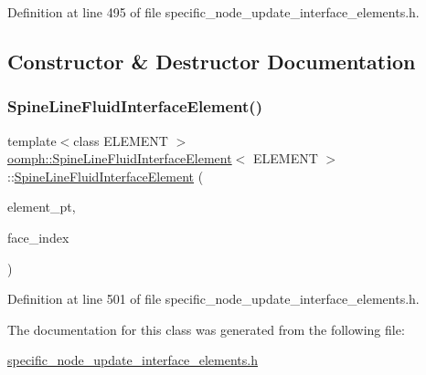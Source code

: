 Definition at line 495 of file specific\+\_\+node\+\_\+update\+\_\+interface\+\_\+elements.\+h.



\subsection{Constructor \& Destructor Documentation}
\mbox{\label{classoomph_1_1SpineLineFluidInterfaceElement_aaafc180606b418920b0588532f8bfbec}} 
\subsubsection{\texorpdfstring{Spine\+Line\+Fluid\+Interface\+Element()}{SpineLineFluidInterfaceElement()}}
{\footnotesize\ttfamily template$<$class E\+L\+E\+M\+E\+NT $>$ \\
\hyperlink{classoomph_1_1SpineLineFluidInterfaceElement}{oomph\+::\+Spine\+Line\+Fluid\+Interface\+Element}$<$ E\+L\+E\+M\+E\+NT $>$\+::\hyperlink{classoomph_1_1SpineLineFluidInterfaceElement}{Spine\+Line\+Fluid\+Interface\+Element} (\begin{DoxyParamCaption}\item[{\hyperlink{classoomph_1_1FiniteElement}{Finite\+Element} $\ast$const \&}]{element\+\_\+pt,  }\item[{const int \&}]{face\+\_\+index }\end{DoxyParamCaption})\hspace{0.3cm}{\ttfamily [inline]}}



Definition at line 501 of file specific\+\_\+node\+\_\+update\+\_\+interface\+\_\+elements.\+h.



The documentation for this class was generated from the following file\+:\begin{DoxyCompactItemize}
\item 
\hyperlink{specific__node__update__interface__elements_8h}{specific\+\_\+node\+\_\+update\+\_\+interface\+\_\+elements.\+h}\end{DoxyCompactItemize}

